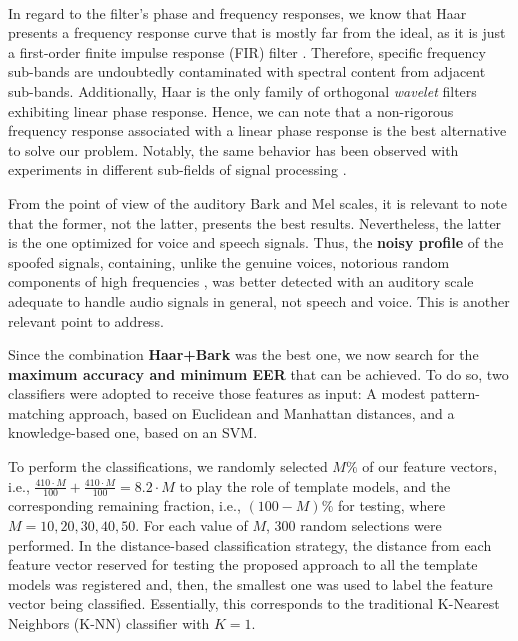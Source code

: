 		\\
		\par In regard to the filter's phase and frequency responses, we know that Haar presents a frequency response curve that is mostly far from the ideal, as it is just a first-order finite impulse response (FIR) filter \cite{WaveletPropertiesBrowser}. Therefore, specific frequency sub-bands are undoubtedly contaminated with spectral content from adjacent sub-bands. Additionally, Haar is the only family of orthogonal \textit{wavelet} filters exhibiting linear phase response. Hence, we can note that a non-rigorous frequency response associated with a linear phase response is the best alternative to solve our problem. Notably, the same behavior has been observed with experiments in different sub-fields of signal processing \cite{guido2}\cite{guido3}\cite{guido4}. 
		\\
		\par From the point of view of the auditory Bark and Mel scales, it is relevant to note that the former, not the latter, presents the best results. Nevertheless, the latter is the one optimized for voice and speech signals. Thus, the \textbf{noisy profile} of the spoofed signals, containing, unlike the genuine voices, notorious random components of high frequencies \cite{dsp1}, was better detected with an auditory scale adequate to handle audio signals in general, not speech and voice. This is another relevant point to address.
		
		
		
		\par Since the combination \textbf{Haar+Bark} was the best one, we now search for the \textbf{maximum accuracy and minimum EER} that can be achieved. To do so, two classifiers were adopted to receive those features as input: A modest pattern-matching approach, based on Euclidean and Manhattan distances, and a knowledge-based one, based on an SVM. 
		\\
		\par To perform the classifications, we randomly selected $M\%$ of our feature vectors, i.e., $\frac{410 \cdot M}{100} + \frac{410 \cdot M}{100} = 8.2 \cdot M$ to play the role of template models, and the corresponding remaining fraction, i.e., $(100-M)\%$ for testing, where $M=10, 20, 30, 40, 50$. For each value of $M$, 300 random selections were performed. In the distance-based classification strategy, the distance from each feature vector reserved for testing the proposed approach to all the template models was registered and, then, the smallest one was used to label the feature vector being classified. Essentially, this corresponds to the traditional K-Nearest Neighbors (K-NN) classifier with $K=1$.     
	
